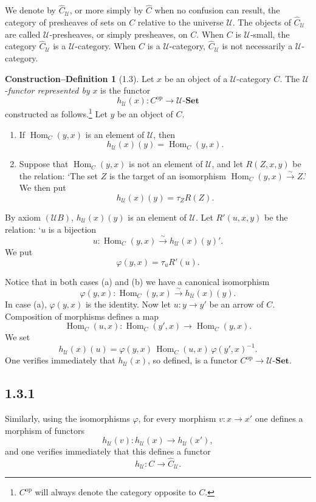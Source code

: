 \documentclass[11pt]{article}
\newcommand{\U}{\mathcal{U}}
\newcommand{\Ens}{\mathbf{Set}}
\newcommand{\Hom}{\operatorname{Hom}}
\newcommand{\op}{\mathrm{op}}
\theoremstyle{definition}
\newtheorem*{constructiondefinitionstar}{Construction--Definition}
\begin{document}
We denote by $\widehat{C}_{\U}$, or more simply by $\widehat{C}$ when no confusion can result, the category of presheaves of sets on $C$ relative to the universe $\U$. The objects of $\widehat{C}_{\U}$ are called $\U$-presheaves, or simply presheaves, on $C$. When $C$ is $\U$-small, the category $\widehat{C}_{\U}$ is a $\U$-category. When $C$ is a $\U$-category, $\widehat{C}_{\U}$ is not necessarily a $\U$-category.

\begin{constructiondefinitionstar}[1.3]
Let $x$ be an object of a $\U$-category $C$. The $\U$-\emph{functor represented by} $x$ is the functor
\[
h_{\U}(x):C^{\op}\longrightarrow \U\text{-}\Ens
\]
constructed as follows.\footnote{$C^{\op}$ will always denote the category opposite to $C$.} Let $y$ be an object of $C$.
\begin{enumerate}
\item[(a)] If $\Hom_C(y,x)$ is an element of $\U$, then
\[
h_{\U}(x)(y)=\Hom_C(y,x).
\]
\item[(b)] Suppose that $\Hom_C(y,x)$ is not an element of $\U$, and let $R(Z,x,y)$ be the relation: `The set $Z$ is the target of an isomorphism $\Hom_C(y,x)\xrightarrow{\sim} Z$.' We then put
\[
h_{\U}(x)(y)=\tau_Z R(Z).
\]
\end{enumerate}
By axiom $(\U B)$, $h_{\U}(x)(y)$ is an element of $\U$. Let $R'(u,x,y)$ be the relation: `$u$ is a bijection
\[
u:\Hom_C(y,x)\xrightarrow{\sim} h_{\U}(x)(y)'.
\]
We put
\[
\varphi(y,x)=\tau_u R'(u).
\]

Notice that in both cases (a) and (b) we have a canonical isomorphism
\[
\varphi(y,x):\Hom_C(y,x)\xrightarrow{\sim}h_{\U}(x)(y).
\]
In case (a), $\varphi(y,x)$ is the identity. Now let $u:y\to y'$ be an arrow of $C$. Composition of morphisms defines a map
\[
\Hom_C(u,x):\Hom_C(y',x)\longrightarrow \Hom_C(y,x).
\]
We set
\[
h_{\U}(x)(u)=\varphi(y,x)\,\Hom_C(u,x)\,\varphi(y',x)^{-1}.
\]
One verifies immediately that $h_{\U}(x)$, so defined, is a functor $C^{\op}\to \U$-$\Ens$.
\end{constructiondefinitionstar}

\subsection*{1.3.1}

Similarly, using the isomorphisms $\varphi$, for every morphism $v:x\to x'$ one defines a morphism of functors
\[
h_{\U}(v):h_{\U}(x)\longrightarrow h_{\U}(x'),
\]
and one verifies immediately that this defines a functor
\[
h_{\U}:C\longrightarrow \widehat{C}_{\U}.
\]
\end{document}
